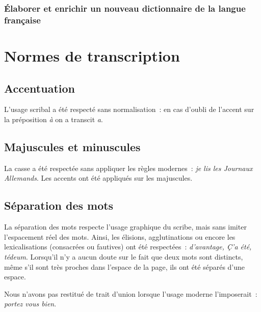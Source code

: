 \documentclass[a4paper,12pt,twoside]{book}
\begin{document}
			\subsection{Élaborer et enrichir un nouveau dictionnaire de la langue française}
				
			
	\appendix
	
	\renewcommand{\appendixpagename}{Annexes}
	
	\renewcommand{\appendixtocname}{Annexes}
	
	\addappheadtotoc%
	
	\appendixpage %
	
	\chapter{Normes de transcription}
		\label{normes-trans}
	
		\section{Accentuation}
			L'usage scribal a été respecté sans normalisation~: en cas d'oubli de l'accent sur la préposition \textit{à} on a transcit \textit{a}.
		
		\section{Majuscules et minuscules}
			La casse a été respectée sans appliquer les règles modernes~: \textit{je lis les Journaux Allemands}. Les accents ont été appliqués sur les majuscules.
		
		\section{Séparation des mots}
			La séparation des mots respecte l'usage graphique du scribe, mais sans imiter l'espacement réel des mots. Ainsi, les élisions, agglutinations ou encore les lexicalisations (consacrées ou fautives) ont été respectées~: \textit{d'avantage, Ç'a été, tédeum}. Lorsqu'il n'y a aucun doute sur le fait que deux mots sont distincts, même s'il sont très proches dans l'espace de la page, ils ont été séparés d'une espace.
		
			Nous n'avons pas restitué de trait d'union lorsque l'usage moderne l'imposerait~: \textit{portez vous bien}.
	
\end{document}

